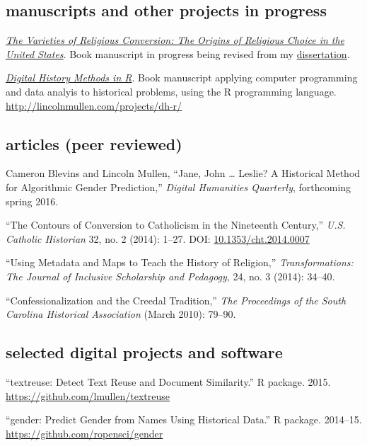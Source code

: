 \documentclass[11pt]{article}
\begin{document}
\subsection{manuscripts and other projects in
  progress}\label{manuscripts-and-other-projects-in-progress}

\emph{\href{/research/\#varieties}{The Varieties of Religious
    Conversion: The Origins of Religious Choice in the United States}}.
Book manuscript in progress being revised from my
\href{/research/\#dissertation}{dissertation}.

\emph{\href{http://dh-r.lincolnmullen.com/}{Digital History Methods in
    R}}. Book manuscript applying computer programming and data analyis to 
historical problems, using the R programming language. 
\url{http://lincolnmullen.com/projects/dh-r/}

\subsection{articles (peer reviewed)}\label{articles-peer-reviewed}

Cameron Blevins and Lincoln Mullen, ``Jane, John \ldots{} Leslie? A
Historical Method for Algorithmic Gender Prediction,'' \emph{Digital
  Humanities Quarterly}, forthcoming spring 2016.

``The Contours of Conversion to Catholicism in the Nineteenth Century,''
\emph{U.S. Catholic Historian} 32, no. 2 (2014): 1--27. DOI:
\href{http://dx.doi.org/10.1353/cht.2014.0007}{10.1353/cht.2014.0007}

``Using Metadata and Maps to Teach the History of Religion,''
\emph{Transformations: The Journal of Inclusive Scholarship and
  Pedagogy}, 24, no. 3 (2014): 34--40.

``Confessionalization and the Creedal Tradition,'' \emph{The Proceedings
  of the South Carolina Historical Association} (March 2010): 79--90.

\subsection{selected digital projects and software}\label{digital-projects}

``textreuse: Detect Text Reuse and Document Similarity.'' R package. 2015. 
\url{https://github.com/lmullen/textreuse}

``gender: Predict Gender from Names Using Historical Data.'' R package. 
2014--15. \url{https://github.com/ropensci/gender}
\end{document}

